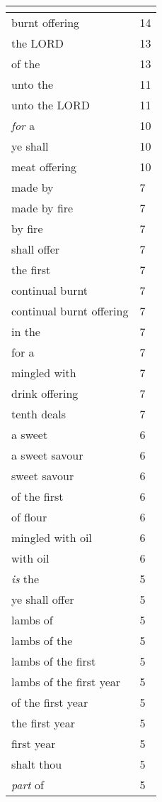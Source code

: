 \begin{center}
\begin{longtable}{|p{3.0in}|p{0.5in}|}
\hline \multicolumn{2}{c}{{ }} \\ \hline
\endfoot 
burnt offering & 14\\ \hline 
the LORD & 13\\ \hline 
of the & 13\\ \hline 
unto the & 11\\ \hline 
unto the LORD & 11\\ \hline 
\emph{for} a & 10\\ \hline 
ye shall & 10\\ \hline 
meat offering & 10\\ \hline 
made by & 7\\ \hline 
made by fire & 7\\ \hline 
by fire & 7\\ \hline 
shall offer & 7\\ \hline 
the first & 7\\ \hline 
continual burnt & 7\\ \hline 
continual burnt offering & 7\\ \hline 
in the & 7\\ \hline 
for a & 7\\ \hline 
mingled with & 7\\ \hline 
drink offering & 7\\ \hline 
tenth deals & 7\\ \hline 
a sweet & 6\\ \hline 
a sweet savour & 6\\ \hline 
sweet savour & 6\\ \hline 
of the first & 6\\ \hline 
of flour & 6\\ \hline 
mingled with oil & 6\\ \hline 
with oil & 6\\ \hline 
\emph{is} the & 5\\ \hline 
ye shall offer & 5\\ \hline 
lambs of & 5\\ \hline 
lambs of the & 5\\ \hline 
lambs of the first & 5\\ \hline 
lambs of the first year & 5\\ \hline 
of the first year & 5\\ \hline 
the first year & 5\\ \hline 
first year & 5\\ \hline 
shalt thou & 5\\ \hline 
\emph{part} of & 5\\ \hline 

\end{longtable}
\end{center}
